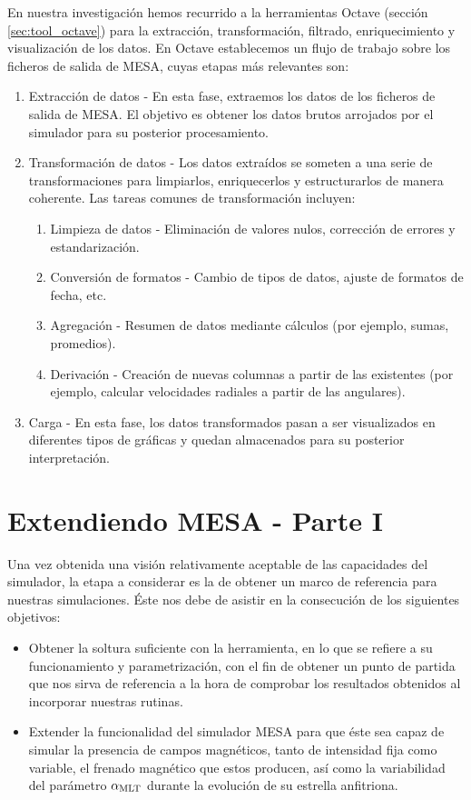 En nuestra investigación hemos recurrido a la herramientas Octave (sección \ref{sec:tool_octave}) para la extracción, transformación, filtrado, enriquecimiento y visualización de los datos. En Octave establecemos un flujo de trabajo sobre los ficheros de salida de MESA, cuyas etapas más relevantes son:
\begin{enumerate}
	\item Extracción de datos - En esta fase, extraemos los datos de los ficheros de salida de MESA. El objetivo es obtener los datos brutos arrojados por el simulador para su posterior procesamiento.
	\item Transformación de datos - Los datos extraídos se someten a una serie de transformaciones para limpiarlos, enriquecerlos y estructurarlos de manera coherente. Las tareas comunes de transformación incluyen:
	\begin{enumerate}
		\item Limpieza de datos - Eliminación de valores nulos, corrección de errores y estandarización.
		\item Conversión de formatos - Cambio de tipos de datos, ajuste de formatos de fecha, etc.
		\item Agregación - Resumen de datos mediante cálculos (por ejemplo, sumas, promedios).
		\item Derivación - Creación de nuevas columnas a partir de las existentes (por ejemplo, calcular velocidades radiales a partir de las angulares).
	\end{enumerate}
	\item Carga -  En esta fase, los datos transformados pasan a ser visualizados en diferentes tipos de gráficas y quedan almacenados para su posterior interpretación. 
\end{enumerate}

\section{Extendiendo MESA - Parte I} \label{mesa_parte1}
Una vez obtenida una visión relativamente aceptable de las capacidades del simulador, la etapa a considerar es la de obtener un marco de referencia para nuestras simulaciones. Éste nos debe de asistir en la consecución de los siguientes objetivos:

\begin{itemize}
    \item Obtener la soltura suficiente con la herramienta, en lo que se refiere a su funcionamiento y parametrización, con el fin de obtener un punto de partida que nos sirva de referencia a la hora de comprobar los resultados obtenidos al incorporar nuestras rutinas.
    \item Extender la funcionalidad del simulador MESA para que éste sea capaz de simular la presencia de campos magnéticos, tanto de intensidad fija como variable, el frenado magnético que estos producen, así como la variabilidad del parámetro $\alpha_{\mathrm{MLT}}$ durante la evolución de su estrella anfitriona.
\end{itemize}

